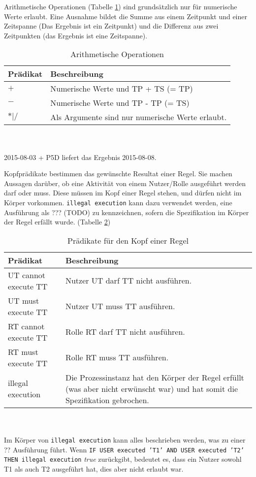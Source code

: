 Arithmetische Operationen (Tabelle \ref{tab:operations}) sind grundsätzlich nur für numerische Werte erlaubt. Eine Ausnahme bildet die Summe aus einem Zeitpunkt und einer Zeitspanne (Das Ergebnis ist ein Zeitpunkt) und die Differenz aus zwei Zeitpunkten (das Ergebnis ist eine Zeitspanne).
\begin{table}[h]
\begin{tabular} {|p{6cm}|p{10cm}|}
\hline
\textbf{Prädikat} & \textbf{Beschreibung}\\
\hline
 $+$ 		& Numerische Werte und TP + TS (= TP) \\
\hline
 $-$		& Numerische Werte und TP - TP (= TS) \\
\hline
 $ * | / $   	& Als Argumente sind nur numerische Werte erlaubt. \\
\hline
\end{tabular}
\\\\\small 2015-08-03 + P5D liefert das Ergebnis 2015-08-08.
\caption{Arithmetische Operationen}
\label{tab:operations}
\end{table}
\newpage
Kopfprädikate bestimmen das gewünschte Resultat einer Regel. Sie machen Aussagen darüber, ob eine Aktivität von einem Nutzer/Rolle ausgeführt werden darf oder muss. Diese müssen im Kopf einer Regel stehen, und dürfen nicht im Körper vorkommen. \texttt{illegal execution} kann dazu verwendet werden, eine Ausführung als ??? (TODO) zu kennzeichnen, sofern die Spezifikation im Körper der Regel erfällt wurde. (Tabelle \ref{tab:head})
\begin{table}[h]
\begin{tabular} {|p{6cm}|p{10cm}|}
\hline
\textbf{Prädikat} & \textbf{Beschreibung}\\
\hline
UT cannot execute TT		& Nutzer UT darf TT nicht ausführen. \\
\hline
UT must execute TT  		& Nutzer UT muss TT ausführen. \\
\hline
RT cannot execute TT		& Rolle RT darf TT nicht ausführen.\\
\hline
RT must execute TT		& Rolle RT muss TT ausführen.\\
\hline
illegal execution		& Die Prozessinstanz hat den Körper der Regel erfüllt (was aber nicht erwünscht war) und hat somit die Spezifikation gebrochen.\\
\hline
\end{tabular}
\\\\\small Im Körper von \texttt{illegal execution} kann alles beschrieben werden, was zu einer ?? Ausführung führt. Wenn \texttt{IF USER executed 'T1' AND USER executed 'T2' THEN illegal execution} \textit{true} zurückgibt, bedeutet es, dass ein Nutzer sowohl T1 als auch T2 ausgeführt hat, dies aber nicht erlaubt war.
\caption{Prädikate für den Kopf einer Regel}
\label{tab:head}
\end{table}



